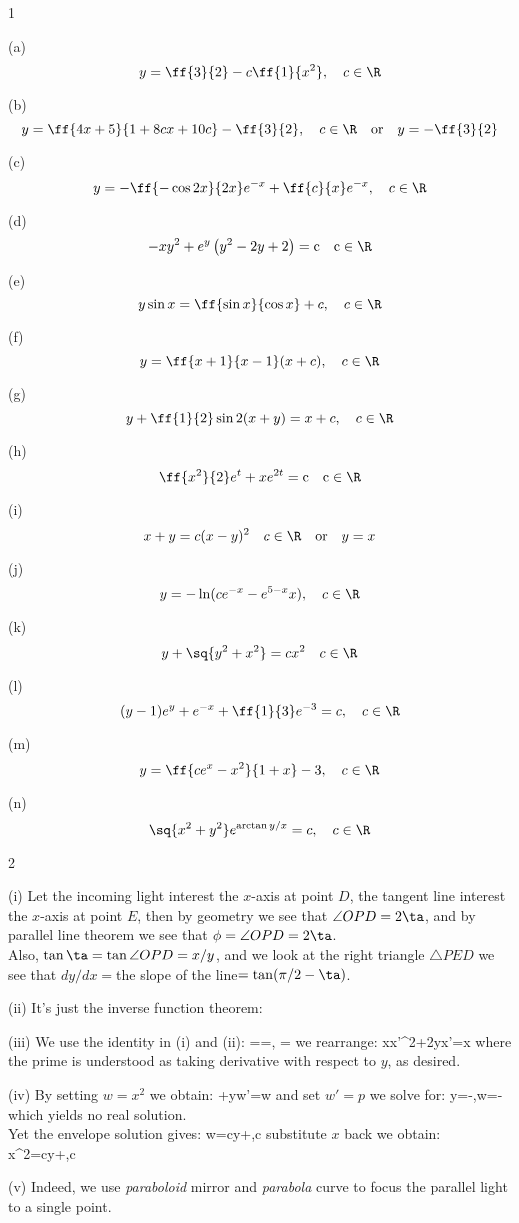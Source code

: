 \documentclass[12pt]{article}
\begin{document}
\begin{vv286_ms}{1}
\item[(a)]
	\[
	y=\ff{3}{2}-c\ff{1}{x^2},
	\quad
	c\in\R
	\]
\item[(b)]
	\[
	y=\ff{4x+5}{1+8cx+10c}-\ff{3}{2},
	\quad
	c\in\R
	\quad
	\text{or}
	\quad
	y=-\ff{3}{2}
	\]
\item[(c)]
	\[
	y=-\ff{-\cos2x}{2x}e^{-x}+\ff{c}{x}e^{-x},
	\quad
	c\in\R
	\]
\item[(d)]
	\[
	-xy^2+e^y\left( y^2-2y+2 \right)=\rm c
	\quad
	c\in\R
	\]
\item[(e)]
	\[
	y\sin x=\ff{\sin x}{\cos x}+c,
	\quad
	c\in\R
	\]
\item[(f)]
	\[
	y=\ff{x+1}{x-1}(x+c),
	\quad
	c\in\R
	\]
\item[(g)]
	\[
	y+\ff{1}{2}\sin2(x+y)=x+c,
	\quad
	c\in\R
	\]
\item[(h)]
	\[
	\ff{x^2}{2}e^t+xe^{2t}=\rm c
	\quad
	c\in\R
	\]
\item[(i)]
	\[
	x+y=c(x-y)^2
	\quad
	c\in\R
	\quad
	\text{or}
	\quad
	y=x
	\]
\item[(j)]
	\[
	y=-\ln(ce^{-x}-e^{5-x}x),
	\quad
	c\in\R
	\]
\item[(k)]
	\[
	y+\sq{y^2+x^2}=cx^2
	\quad
	c\in\R
	\]	
\item[(l)]
	\[
	(y-1)e^y+e^{-x}+\ff{1}{3}e^{-3}=c,
	\quad
	c\in\R
	\]
\item[(m)]
	\[
	y=\ff{ce^x-x^2}{1+x}-3,
	\quad
	c\in\R
	\]
\item[(n)]
	\[
	\sq{x^2+y^2}e^{\arctan y/x}=c,
	\quad
	c\in\R
	\]
\end{vv286_ms}


\begin{vv286_ms}{2}
\item[(i)]
	Let the incoming light interest the $x$-axis at point
	$D$, the tangent line interest the $x$-axis at point
	$E$, then by geometry we see that $\angle OPD=2\ta$,
	and by parallel line theorem we see that $\phi=\angle
	OPD=2\ta$.\\
	Also, $\tan\ta=\tan\angle OPD={x}/{y}$, and we look
	at the right triangle $\triangle PED$ we see that
	${dy}/{dx}=$\rm the slope of the
	line$=\tan(\pi/2-\ta)$.
\item[(ii)]
	It's just the inverse function theorem:
\item[(iii)]
	We use the identity in (i) and (ii):
	\eq
	{
	=\ta=,
	\quad
	\tan\ta=
	}
	we rearrange:
	\eq
	{
	xx'^2+2yx'=x
	}
	where the prime is understood as taking derivative
	with respect to $y$, as desired.
\item[(iv)]
	By setting $w=x^2$ we obtain:
	\eq
	{
	+yw'=w
	}
	and set $w'=p$ we solve for:
	\eq
	{
	y=-,\quad w=-
	}
	which yields no real solution.\\
	Yet the envelope solution gives:
	\eq
	{
	w=cy+,\quad c\in\R
	}
	substitute $x$ back we obtain:
	\eq
	{
	x^2=cy+,\quad c\in\R
	}
\item[(v)]
	Indeed, we use {\it paraboloid } mirror and {\it
	parabola} curve to focus the parallel light to a
	single point.
\end{vv286_ms}
\end{document}
